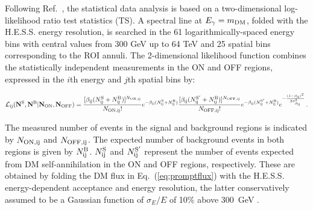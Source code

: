\documentclass[aps,prl,twocolumn,floats,balancelastpage,showpacs,showkeys,preprintnumbers,floatfix,nofootinbib,superscriptaddress, longbibliography]{revtex4-1}
\begin{document}
Following Ref.~\cite{HESS:2022ygk}, the statistical data analysis is based on a two-dimensional log-likelihood ratio test statistics (TS).
A spectral line at $E_\gamma = m_{\rm DM}$, folded with the H.E.S.S. energy resolution, is searched in the 61 logarithmically-spaced energy bins with central values from 300 GeV up to 64 TeV and 25 spatial bins corresponding to the ROI annuli. The 2-dimensional likelihood function combines the statistically independent measurements in the ON and OFF regions, expressed in the $i$th energy and $j$th spatial bins by:
\begin{widetext}
\begin{equation}
\mathcal{L}_{\rm ij}({\bf N}^{\rm S},{\bf N}^{\rm B}|{\bf N}_{\rm ON},{\bf N}_{\rm OFF}) = \frac{[\beta_{\rm ij}(N_{\rm ij}^{\rm S}+N_{\rm ij}^{\rm B})]^{N_{{\rm ON, ij}}}}{N_{{\rm ON, ij}}!}e^{-\beta_{\rm ij}(N_{\rm ij}^{\rm S}+ N_{\rm ij}^{\rm B})}
\frac{[\beta_{\rm ij}(N_{\rm ij}^{\rm S'}+N_{\rm ij}^{\rm B})]^{N_{{\rm OFF, ij}}}}{N_{{\rm OFF, ij}}!}e^{-\beta_{\rm ij}(N_{\rm ij}^{\rm S'}+N_{\rm ij}^{\rm B})} e^{-\frac{(1-\beta_{\rm ij})^2}{2\sigma_{\beta_{\rm ij}}^2}} \, .
\label{eq:lik}
\end{equation}
\end{widetext}
The measured number of events in the signal and background regions is indicated by $N_{\rm ON,ij}$ and $N_{\rm OFF,ij}$.
The expected number of background events in both regions is given by $N^{\rm B}_{\rm ij}$.
$N^{\rm S}_{\rm ij}$ and $N^{\rm S'}_{\rm ij}$ represent the number of events expected from DM self-annihilation in the ON and OFF regions, respectively.
These are obtained by folding the DM flux in Eq.~(\ref{eq:promptflux}) with the H.E.S.S. energy-dependent acceptance and energy resolution, the latter conservatively assumed to be a Gaussian function of $\sigma_E/E$ of 10\% above 300~GeV \cite{deNaurois:2009ud}.
\end{document}
